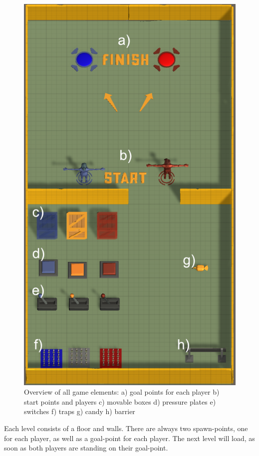 \begin{figure}
    \centering
    \includegraphics[scale=0.4]{images/lobby_game_elements.png}
    \caption{Overview of all game elements:
    a) goal points for each player b) start points and players c) movable boxes d) pressure plates e) switches f) traps g) candy h) barrier}
    \label{fig:game elements}
\end{figure}


Each level consists of a floor and walls. There are always two spawn-points, one for each player, as well as a goal-point for each player. The next level will load, as soon as both players are standing on their goal-point.


